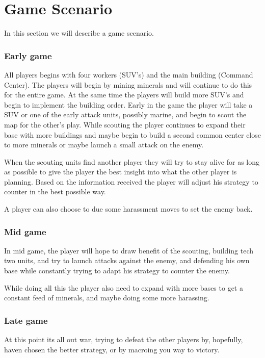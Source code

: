 \section{Game Scenario}
	In this section we will describe a game scenario.
	
	\subsubsection{Early game}
		All players begins with four workers (SUV's) and the main building (Command Center).	The players will begin by mining minerals and will continue to do this for the entire game. At the same time the players will build more SUV's and begin to implement the building order. 			Early in the game the player will take a SUV or one of the early attack units, possibly marine, and begin to scout the map for the other's play. 
		While scouting the player continues to expand their base with more buildings and maybe begin to build a second common center close to more minerals or maybe launch a small attack on the enemy.
		
		When the scouting units find another player they will try to stay alive for as long as possible to give the player the best insight into what the other player is planning. Based on the information received the player will adjust his strategy to counter in the best possible way.
		
		A player can also choose to due some harassment moves to set the enemy back.
		
	\subsubsection{Mid game}
		In mid game, the player will hope to draw benefit of the scouting, building tech two units, and try to launch attacks against the enemy, and defending his own base while constantly trying to adapt his strategy to counter the enemy.
		
		While doing all this the player also need to expand with more bases to get a constant feed of minerals, and maybe doing some more harassing.
		
	\subsubsection{Late game}
		At this point its all out war, trying to defeat the other players by, hopefully, haven chosen the better strategy, or by macroing you way to victory.